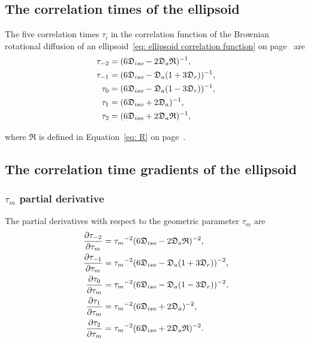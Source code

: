 
\newpage
\subsection{The correlation times of the ellipsoid}

The five correlation times $\tau_i$ in the correlation function of the Brownian rotational diffusion of an ellipsoid~\eqref{eq: ellipsoid correlation function} on page~\pageref{eq: ellipsoid correlation function} are
\begin{subequations}
\begin{align}
    \tau_{-2} &= (6\mathfrak{D}_{iso} - 2\mathfrak{D}_a\mathfrak{R})^{-1}, \\
    \tau_{-1} &= (6\mathfrak{D}_{iso} - \mathfrak{D}_a (1 + 3\mathfrak{D}_r))^{-1}, \\
    \tau_{0}  &= (6\mathfrak{D}_{iso} - \mathfrak{D}_a (1 - 3\mathfrak{D}_r))^{-1}, \\
    \tau_{1}  &= (6\mathfrak{D}_{iso} + 2\mathfrak{D}_a)^{-1}, \\
    \tau_{2}  &= (6\mathfrak{D}_{iso} + 2\mathfrak{D}_a\mathfrak{R})^{-1},
\end{align}
\end{subequations}

\noindent where $\mathfrak{R}$ is defined in Equation~\eqref{eq: R} on page~\pageref{eq: R}.




\subsection{The correlation time gradients of the ellipsoid}


\subsubsection{$\tau_m$ partial derivative}

The partial derivatives with respect to the geometric parameter $\tau_m$ are
\begin{subequations}
\begin{align}
    \frac{\partial \tau_{-2}}{\partial \tau_m} &= {\tau_m}^{-2} (6\mathfrak{D}_{iso} - 2\mathfrak{D}_a\mathfrak{R})^{-2}, \\
    \frac{\partial \tau_{-1}}{\partial \tau_m} &= {\tau_m}^{-2} (6\mathfrak{D}_{iso} - \mathfrak{D}_a (1 + 3\mathfrak{D}_r))^{-2}, \\
    \frac{\partial \tau_{0}}{\partial \tau_m}  &= {\tau_m}^{-2} (6\mathfrak{D}_{iso} - \mathfrak{D}_a (1 - 3\mathfrak{D}_r))^{-2}, \\
    \frac{\partial \tau_{1}}{\partial \tau_m}  &= {\tau_m}^{-2} (6\mathfrak{D}_{iso} + 2\mathfrak{D}_a)^{-2}, \\
    \frac{\partial \tau_{2}}{\partial \tau_m}  &= {\tau_m}^{-2} (6\mathfrak{D}_{iso} + 2\mathfrak{D}_a\mathfrak{R})^{-2}.
\end{align}
\end{subequations}



